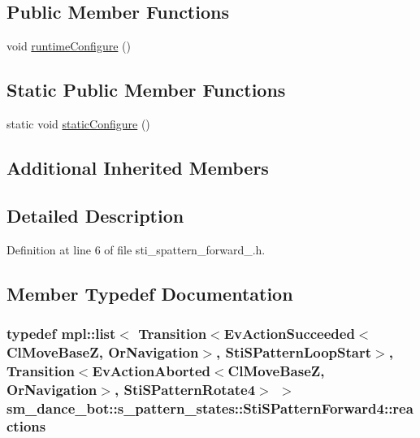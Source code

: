 \subsection*{Public Member Functions}
\begin{DoxyCompactItemize}
\item 
void \hyperlink{structsm__dance__bot_1_1s__pattern__states_1_1StiSPatternForward4_ad1bb20f5c465c5547da170da2d9c3292}{runtime\+Configure} ()
\end{DoxyCompactItemize}
\subsection*{Static Public Member Functions}
\begin{DoxyCompactItemize}
\item 
static void \hyperlink{structsm__dance__bot_1_1s__pattern__states_1_1StiSPatternForward4_a387e35cd74525e1c124639f4452dbb6b}{static\+Configure} ()
\end{DoxyCompactItemize}
\subsection*{Additional Inherited Members}


\subsection{Detailed Description}


Definition at line 6 of file sti\+\_\+spattern\+\_\+forward\+\_.\+h.



\subsection{Member Typedef Documentation}
\subsubsection[{\texorpdfstring{reactions}{reactions}}]{\setlength{\rightskip}{0pt plus 5cm}typedef mpl\+::list$<$ Transition$<$Ev\+Action\+Succeeded$<${\bf Cl\+Move\+BaseZ}, {\bf Or\+Navigation}$>$, {\bf Sti\+S\+Pattern\+Loop\+Start}$>$, Transition$<$Ev\+Action\+Aborted$<${\bf Cl\+Move\+BaseZ}, {\bf Or\+Navigation}$>$, {\bf Sti\+S\+Pattern\+Rotate4}$>$ $>$ {\bf sm\+\_\+dance\+\_\+bot\+::s\+\_\+pattern\+\_\+states\+::\+Sti\+S\+Pattern\+Forward4\+::reactions}}\hypertarget{structsm__dance__bot_1_1s__pattern__states_1_1StiSPatternForward4_a4a0eaecaf39945c6a9b01c8536898455}{}\label{structsm__dance__bot_1_1s__pattern__states_1_1StiSPatternForward4_a4a0eaecaf39945c6a9b01c8536898455}


